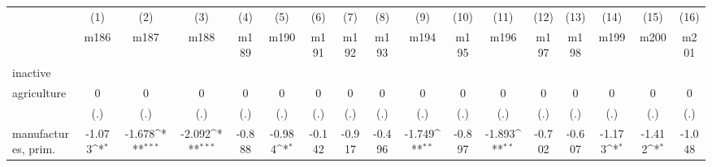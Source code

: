 {
\def\sym#1{\ifmmode^{#1}\else\(^{#1}\)\fi}
\begin{tabular}{l*{16}{c}}
\hline\hline
                    &\multicolumn{1}{c}{(1)}&\multicolumn{1}{c}{(2)}&\multicolumn{1}{c}{(3)}&\multicolumn{1}{c}{(4)}&\multicolumn{1}{c}{(5)}&\multicolumn{1}{c}{(6)}&\multicolumn{1}{c}{(7)}&\multicolumn{1}{c}{(8)}&\multicolumn{1}{c}{(9)}&\multicolumn{1}{c}{(10)}&\multicolumn{1}{c}{(11)}&\multicolumn{1}{c}{(12)}&\multicolumn{1}{c}{(13)}&\multicolumn{1}{c}{(14)}&\multicolumn{1}{c}{(15)}&\multicolumn{1}{c}{(16)}\\
                    &\multicolumn{1}{c}{m186}&\multicolumn{1}{c}{m187}&\multicolumn{1}{c}{m188}&\multicolumn{1}{c}{m189}&\multicolumn{1}{c}{m190}&\multicolumn{1}{c}{m191}&\multicolumn{1}{c}{m192}&\multicolumn{1}{c}{m193}&\multicolumn{1}{c}{m194}&\multicolumn{1}{c}{m195}&\multicolumn{1}{c}{m196}&\multicolumn{1}{c}{m197}&\multicolumn{1}{c}{m198}&\multicolumn{1}{c}{m199}&\multicolumn{1}{c}{m200}&\multicolumn{1}{c}{m201}\\
\hline
inactive            &                     &                     &                     &                     &                     &                     &                     &                     &                     &                     &                     &                     &                     &                     &                     &                     \\
agriculture         &           0         &           0         &           0         &           0         &           0         &           0         &           0         &           0         &           0         &           0         &           0         &           0         &           0         &           0         &           0         &           0         \\
                    &         (.)         &         (.)         &         (.)         &         (.)         &         (.)         &         (.)         &         (.)         &         (.)         &         (.)         &         (.)         &         (.)         &         (.)         &         (.)         &         (.)         &         (.)         &         (.)         \\
[1em]
manufactures, prim. &      -1.073\sym{*}  &      -1.678\sym{***}&      -2.092\sym{***}&      -0.888         &      -0.984\sym{*}  &      -0.142         &      -0.917         &      -0.496         &      -1.749\sym{**} &      -0.897         &      -1.893\sym{**} &      -0.702         &      -0.607         &      -1.173\sym{*}  &      -1.412\sym{*}  &      -1.048         \\

\end{tabular}}
